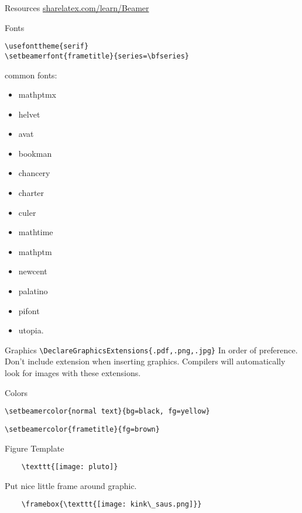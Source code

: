 \documentclass[9pt]{beamer}
\begin{document}
\begin{frame}[fragile=singleslide]{Resources}
    \url{sharelatex.com/learn/Beamer}
\end{frame}%
\begin{frame}[fragile=singleslide]{Fonts}
    \begin{verbatim}
\usefonttheme{serif}
\setbeamerfont{frametitle}{series=\bfseries}
    \end{verbatim}
common fonts:
    \begin{itemize}
        \item mathptmx
        \item helvet
        \item avat
        \item bookman
        \item chancery
        \item charter
        \item culer
        \item mathtime
        \item mathptm
        \item newcent
        \item palatino
        \item pifont
        \item utopia.
    \end{itemize}
\end{frame}%
\begin{frame}[fragile=singleslide]{Graphics}
    \verb|\DeclareGraphicsExtensions{.pdf,.png,.jpg}|
    In order of preference. Don't include extension when inserting
    graphics. Compilers will automatically look for images with these
    extensions.
\end{frame}%
\begin{frame}[fragile=singleslide]{Colors}
    \begin{list}{}
        \item \verb|\setbeamercolor{normal text}{bg=black, fg=yellow}|
        \item \verb|\setbeamercolor{frametitle}{fg=brown}|
    \end{list}
\end{frame}%
\begin{frame}[fragile=singleslide]{Figure Template}
    \begin{verbatim}
    \texttt{[image: pluto]}
    \end{verbatim}
    Put nice little frame around graphic.
    \begin{verbatim}
    \framebox{\texttt{[image: kink\_saus.png]}}
    \end{verbatim}
\end{frame}%
\end{document}
